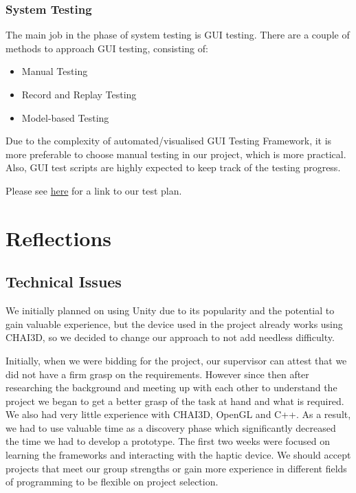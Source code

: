 \documentclass[a4paper]{article}
\begin{document}
\subsubsection*{System Testing}
The main job in the phase of system testing is GUI testing. There are a couple of methods to approach GUI testing, consisting of:

\begin{itemize}
    \item Manual Testing
    \item Record and Replay Testing
    \item Model-based Testing
\end{itemize}

Due to the complexity of automated/visualised GUI Testing Framework, it is more preferable to choose manual testing in our project, which is more practical. Also, GUI test scripts are highly expected to keep track of the testing progress.

Please see \href{https://docs.google.com/document/d/1Of_F73lLm8gSInwTWr7jOGn-hGaFQyB_CK64t97rgiY/edit?usp=sharing}{here} for a link to our test plan.

\section{Reflections}
\subsection{Technical Issues}
We initially planned on using Unity due to its popularity and the potential to gain valuable experience,  but the device used in the project already works using CHAI3D, so we decided to change our approach to not add needless difficulty.

Initially, when we were bidding for the project, our supervisor can attest that we did not have a firm grasp on the requirements. However since then after researching the background and meeting up with each other to understand the project we began to get a better grasp of the task at hand and what is required. We also had very little experience with CHAI3D, OpenGL and C++. As a result, we had to use valuable time as a discovery phase which significantly decreased the time we had to develop a prototype. The first two weeks were focused on learning the frameworks and interacting with the haptic device. We should accept projects that meet our group strengths or gain more experience in different fields of programming to be flexible on project selection.
\end{document}
